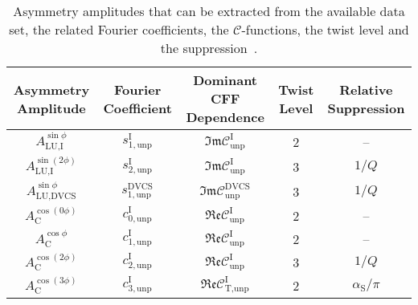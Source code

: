 \begin{table}[H]
\begin{center}
\resizebox{16cm}{!} {
 \begin{tabular}{|c|c|c|c|c|}
\hline
Asymmetry Amplitude & Fourier Coefficient& Dominant CFF Dependence & Twist Level  & Relative Suppression \\
\hline
\hline
$A_{\textrm{LU,I}}^{\sin\phi}$ & $s_{1,\textrm{unp}}^{\textrm{I}}$  &
$\mathfrak{Im}\mathcal{C}_{\textrm{unp}}^{\textrm{I}}$
&  2 & --\\
\hline
$A_{\textrm{LU,I}}^{\sin(2\phi)}$ & $s_{2,\textrm{unp}}^{\textrm{I}}$ 
&
$\mathfrak{Im}\mathcal{C}_{\textrm{unp}}^{\textrm{I}}$
&  3 & $1/Q$\\
\hline
\hline
$A_{\textrm{LU,DVCS}}^{\sin\phi}$ & $s_{1, \textrm{unp}}^{\textrm{DVCS}}$ &
$\mathfrak{Im}\mathcal{C}_{\textrm{unp}}^{\textrm{DVCS}}$ &  3 & $1/Q$ \\
\hline
\hline
$A_{\textrm{C}}^{\cos(0\phi)}$ & $c_{0,\textrm{unp}}^{\textrm{I}}$  &
$\mathfrak{Re}\mathcal{C}_{\textrm{unp}}^{\textrm{I}}$ & 2& --
\\
\hline
$A_{\textrm{C}}^{\cos\phi}$ & $c_{1,\textrm{unp}}^{\textrm{I}}$  &
$\mathfrak{Re}\mathcal{C}_{\textrm{unp}}^{\textrm{I}}$ & 2 & --
\\
\hline
$A_{\textrm{C}}^{\cos(2\phi)}$ & $c_{2,\textrm{unp}}^{\textrm{I}}$ &
$\mathfrak{Re}\mathcal{C}_{\textrm{unp}}^{\textrm{I}}$ & 3 & $1/Q$ \\
\hline
$A_{\textrm{C}}^{\cos(3\phi)}$ & $c_{3,\textrm{unp}}^{\textrm{I}}$ &
$\mathfrak{Re}\mathcal{C}_{\textrm{T,unp}}^{\textrm{I}}$ &  2 & $\alpha_{\textrm{S}}/\pi$ \\
\hline
 \end{tabular}
}
\caption{Asymmetry amplitudes that can
be extracted from the available data set, the related Fourier coefficients,
 the $\mathcal{C}$-functions, the twist level and the suppression~\cite{Bel02b}.}
\label{tab_amplitudes}
\end{center}
\end{table}
 
